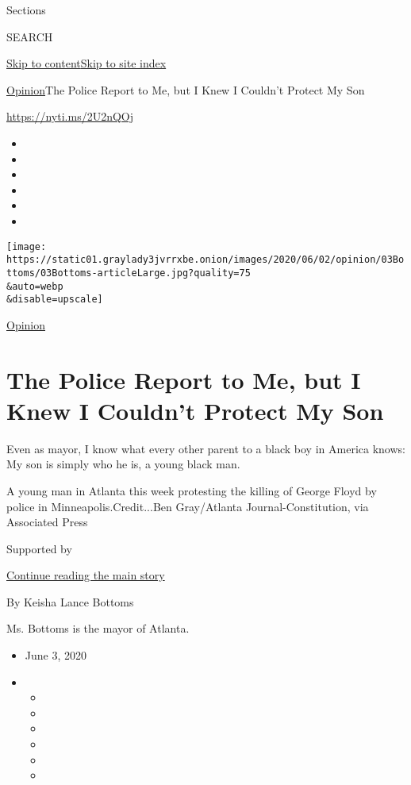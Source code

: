 Sections

SEARCH

\protect\hyperlink{site-content}{Skip to
content}\protect\hyperlink{site-index}{Skip to site index}

\href{/section/opinion}{Opinion}\textbar{}The Police Report to Me, but I
Knew I Couldn't Protect My Son

\url{https://nyti.ms/2U2nQOj}

\begin{itemize}
\item
\item
\item
\item
\item
\item
\end{itemize}

\texttt{[image: https://static01.graylady3jvrrxbe.onion/images/2020/06/02/opinion/03Bottoms/03Bottoms-articleLarge.jpg?quality=75\\\&auto=webp\\\&disable=upscale]}

\href{/section/opinion}{Opinion}

\hypertarget{the-police-report-to-me-but-i-knew-i-couldnt-protect-my-son}{%
\section{The Police Report to Me, but I Knew I Couldn't Protect My
Son}\label{the-police-report-to-me-but-i-knew-i-couldnt-protect-my-son}}

Even as mayor, I know what every other parent to a black boy in America
knows: My son is simply who he is, a young black man.

A young man in Atlanta this week protesting the killing of George Floyd
by police in Minneapolis.Credit...Ben Gray/Atlanta Journal-Constitution,
via Associated Press

Supported by

\protect\hyperlink{after-sponsor}{Continue reading the main story}

By Keisha Lance Bottoms

Ms. Bottoms is the mayor of Atlanta.

\begin{itemize}
\item
  June 3, 2020
\item
  \begin{itemize}
  \item
  \item
  \item
  \item
  \item
  \item
  \end{itemize}
\end{itemize}

